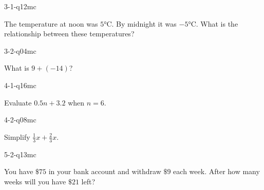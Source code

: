 \begin{practiceQuestion}{3-1-q12}{mc}
\begin{questionText}
The temperature at noon was $5°$C. By midnight it was $-5°$C. What is the relationship between these temperatures?
\end{questionText}
\end{practiceQuestion}

\begin{practiceQuestion}{3-2-q04}{mc}
\begin{questionText}
What is $9 + (-14)$?
\end{questionText}
\end{practiceQuestion}

\begin{practiceQuestion}{4-1-q16}{mc}
\begin{questionText}
Evaluate $0.5n + 3.2$ when $n = 6$.
\end{questionText}
\end{practiceQuestion}

\begin{practiceQuestion}{4-2-q08}{mc}
\begin{questionText}
Simplify $\frac{1}{3}x + \frac{2}{3}x$.


\begin{center}
\hspace{1cm}
\end{center}
\end{questionText}
\end{practiceQuestion}

\begin{practiceQuestion}{5-2-q13}{mc}
\begin{questionText}
You have $\$75$ in your bank account and withdraw $\$9$ each week. After how many weeks will you have $\$21$ left?
\end{questionText}
\end{practiceQuestion}

